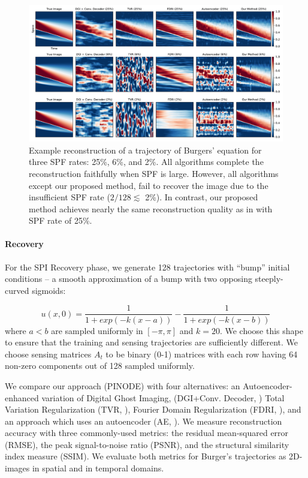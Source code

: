 \begin{figure}[t]
    \centering
    	\includegraphics[width=\textwidth]{figures/cs_burgers_comparison_all.pdf}
    \caption{\label{fig:cs_burgers_example_large_spf} Example reconstruction of a trajectory of Burgers' equation for three SPF rates: 25\%, 6\%, and 2\%. All algorithms complete the reconstruction faithfully when SPF is large. However, all algorithms except our proposed method, fail to recover the image due to the insufficient SPF rate ($2/128 \lesssim$ 2\%). In contrast, our proposed method achieves nearly the same reconstruction quality as in with SPF rate of 25\%.}
\end{figure}

\paragraph{Recovery}
For the SPI Recovery phase, we generate 128 trajectories with ``bump'' initial conditions -- a smooth approximation of a bump with two opposing steeply-curved sigmoids:

\begin{equation}
    \label{eq:burger_initial_condition_bumps}
    u(x, 0) = \frac{1}{1 + exp(-k(x-a))} - \frac{1}{1 + exp(-k(x-b))}
\end{equation}
where $a < b$ are sampled uniformly in $[-\pi, \pi]$ and $k = 20$. We choose this shape to ensure that the training and sensing trajectories are sufficiently different. We choose sensing matrices $A_t$ to be binary (0-1) matrices with each row having 64 non-zero components out of 128 sampled uniformly.



We compare our approach (PINODE) with four alternatives: an Autoencoder-enhanced variation of Digital Ghost Imaging, \citep{ferri2010differential,gong2010method}(DGI+Conv. Decoder, \citep{wang2022single}) Total Variation Regularization  (TVR, \citep{bian2018experimental}), Fourier Domain Regularization (FDRI, \citep{czajkowski2018real}), and an approach which uses an autoencoder (AE, \citep{bora2017compressed}). We measure reconstruction accuracy with three commonly-used metrics: the residual mean-squared error (RMSE), the peak signal-to-noise ratio (PSNR), and the structural similarity index measure (SSIM). We evaluate both metrics for Burger's trajectories as 2D-images in spatial and in temporal domains. 

